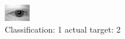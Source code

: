 \begin{figure}[h!]
\begin{center}
\includegraphics[width=0.60\columnwidth]{figures/ID510_class_1_target_2.png}
\end{center}
\caption{ Classification: 1 actual target: 2}
\label{fig:ID510_class_1_target_2}
\end{figure}
